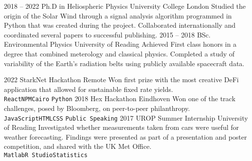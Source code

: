 \documentclass[9pt]{developercv} %
\begin{document}


\begin{entrylist}
	\entry
		{2018 -- 2022}
		{Ph.D in Heliospheric Physics}
		{University College London}
		{Studied the origin of the Solar Wind through a signal analysis algorithm programmed in Python that was created during the project. Collaborated internationally and coordinated several papers to successful publishing.}
	\entry
		{2015 -- 2018}
		{BSc. Environmental Physics}
		{University of Reading}
		{Achieved First class honors in a degree that combined meterology and classical physics. Completed a study of variability of the Earth's radiation belts using publicly available spacecraft data.}
\end{entrylist}


\begin{entrylist}
	\entry
		{2022}
		{StarkNet Hackathon}
		{Remote}
		{Won first prize with the most creative DeFi application that allowed for sustainable fixed rate yields.\\ \texttt{React}\slashsep\texttt{NPM}\slashsep\texttt{Cairo} \slashsep\texttt{Python}}
	\entry
		{2018}
		{Hex Hackathon}
		{Eindhoven}
		{Won one of the track challenges, posed by Bloomberg, on peer-to-peer philanthropy.\\ \texttt{JavaScript}\slashsep\texttt{HTML}\slashsep\texttt{CSS} \slashsep\texttt{Public Speaking}}
  \entry
		{2017}
		{UROP Summer Internship}
		{University of Reading}
		{Investigated whether measurements taken from cars were useful for weather forecasting. Findings were presented as part of a presentation and poster competition, and shared with the UK Met Office. \\\texttt{Matlab}\slashsep\texttt{R Studio}\slashsep\texttt{Statistics}}
\end{entrylist}

\end{document}
